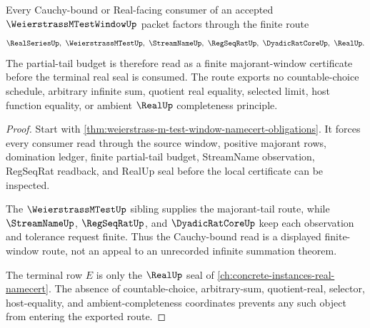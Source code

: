 \begin{theorem}
\label{thm:weierstrass-m-test-window-cauchy-bound-route}
Every Cauchy-bound or Real-facing consumer of an accepted $\WeierstrassMTestWindowUp$ packet factors through the finite route
$$
\RealSeriesUp,\ \WeierstrassMTestUp,\ \StreamNameUp,\ \RegSeqRatUp,\ \DyadicRatCoreUp,\ \RealUp .
$$
The partial-tail budget is therefore read as a finite majorant-window certificate before the terminal real seal is consumed. The route exports no countable-choice schedule, arbitrary infinite sum, quotient real equality, selected limit, host function equality, or ambient $\RealUp$ completeness principle.
\end{theorem}
\begin{proof}
Start with \autoref{thm:weierstrass-m-test-window-namecert-obligations}. It forces every consumer read through the source window, positive majorant rows, domination ledger, finite partial-tail budget, StreamName observation, RegSeqRat readback, and RealUp seal before the local certificate can be inspected.

The $\WeierstrassMTestUp$ sibling supplies the majorant-tail route, while $\StreamNameUp$, $\RegSeqRatUp$, and $\DyadicRatCoreUp$ keep each observation and tolerance request finite. Thus the Cauchy-bound read is a displayed finite-window route, not an appeal to an unrecorded infinite summation theorem.

The terminal row $E$ is only the $\RealUp$ seal of \autoref{ch:concrete-instances-real-namecert}. The absence of countable-choice, arbitrary-sum, quotient-real, selector, host-equality, and ambient-completeness coordinates prevents any such object from entering the exported route.
\end{proof}



